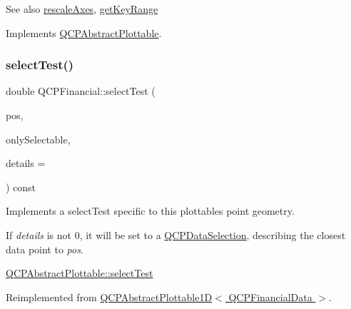 \begin{DoxySeeAlso}{See also}
\hyperlink{classQCPAbstractPlottable_a1491c4a606bccd2d09e65e11b79eb882}{rescale\+Axes}, \hyperlink{classQCPFinancial_a15d68fb257113fef697356d65fa76559}{get\+Key\+Range} 
\end{DoxySeeAlso}


Implements \hyperlink{classQCPAbstractPlottable_a4de773988b21ed090fddd27c6a3a3dcb}{Q\+C\+P\+Abstract\+Plottable}.

\mbox{\label{classQCPFinancial_aac8e91622ac58330fa9ce81cc8fd40ee}} 
\subsubsection{\texorpdfstring{select\+Test()}{selectTest()}}
{\footnotesize\ttfamily double Q\+C\+P\+Financial\+::select\+Test (\begin{DoxyParamCaption}\item[{const Q\+PointF \&}]{pos,  }\item[{bool}]{only\+Selectable,  }\item[{Q\+Variant $\ast$}]{details = {} }\end{DoxyParamCaption}) const\hspace{0.3cm}{\ttfamily [virtual]}}

Implements a select\+Test specific to this plottable\textquotesingle{}s point geometry.

If {\itshape details} is not 0, it will be set to a \hyperlink{classQCPDataSelection}{Q\+C\+P\+Data\+Selection}, describing the closest data point to {\itshape pos}.

\hyperlink{classQCPAbstractPlottable_addb3f5c41f007a78c3e142cc605bc712}{Q\+C\+P\+Abstract\+Plottable\+::select\+Test} 

Reimplemented from \hyperlink{classQCPAbstractPlottable1D_a4611b43bcb6441b2154eb4f4e0a33db2}{Q\+C\+P\+Abstract\+Plottable1\+D$<$ Q\+C\+P\+Financial\+Data $>$}.

\mbox{\label{classQCPFinancial_a3c5beb1ab028a1dba845fc9dcffc7cf4}} 
